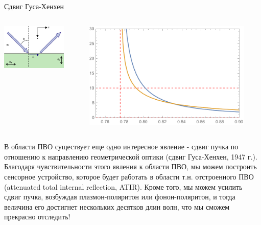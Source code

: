 \documentclass[9pt, compress, xcolor=table]{beamer}
\begin{document}
\begin{frame}{Сдвиг Гуса-Хенхен}

\begin{columns}[c]

\column{6.5cm}
\begin{center}
\includegraphics[width=0.8\textwidth]{ghsh}
\end{center}
 

\column{6.5cm}
\begin{center}
\includegraphics[width=0.9\textwidth]{goos-hanchen_shift}
\end{center}
\end{columns}

В области ПВО существует еще одно интересное явление - сдвиг пучка по отношению к направлению геометрической оптики (сдвиг Гуса-Хенхен, 1947 г.). Благодаря чувствительности этого явления к области ПВО, мы можем построить сенсорное устройство, которое будет работать в области т.н. отстроенного ПВО (attenuated total internal reflection, ATIR). Кроме того, мы можем усилить сдвиг пучка, возбуждая плазмон-поляритон или фонон-поляритон, и тогда величина его достигнет нескольких десятков длин волн, что мы сможем прекрасно отследить!

\end{frame}
\end{document}
